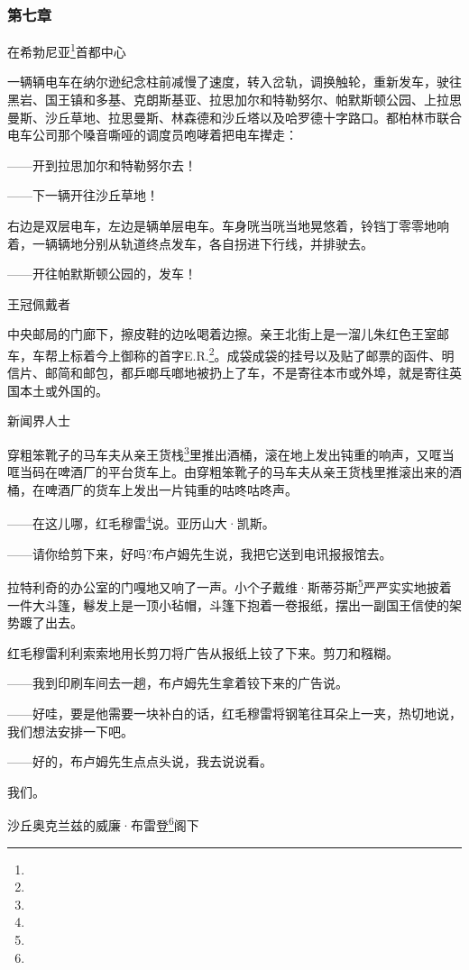 \subsubsection*{第七章}

\par 在希勃尼亚\footnote{}首都中心
\par 一辆辆电车在纳尔逊纪念柱前减慢了速度，转入岔轨，调换触轮，重新发车，驶往黑岩、国王镇和多基、克朗斯基亚、拉思加尔和特勒努尔、帕默斯顿公园、上拉思曼斯、沙丘草地、拉思曼斯、林森德和沙丘塔以及哈罗德十字路口。都柏林市联合电车公司那个嗓音嘶哑的调度员咆哮着把电车撵走：
\par ——开到拉思加尔和特勒努尔去！
\par ——下一辆开往沙丘草地！
\par 右边是双层电车，左边是辆单层电车。车身咣当咣当地晃悠着，铃铛丁零零地响着，一辆辆地分别从轨道终点发车，各自拐进下行线，并排驶去。
\par ——开往帕默斯顿公园的，发车！
\par 王冠佩戴者
\par 中央邮局的门廊下，擦皮鞋的边吆喝着边擦。亲王北街上是一溜儿朱红色王室邮车，车帮上标着今上御称的首字E.R.\footnote{}。成袋成袋的挂号以及贴了邮票的函件、明信片、邮简和邮包，都乒啷乓啷地被扔上了车，不是寄往本市或外埠，就是寄往英国本土或外国的。
\par 新闻界人士
\par 穿粗笨靴子的马车夫从亲王货栈\footnote{}里推出酒桶，滚在地上发出钝重的响声，又哐当哐当码在啤酒厂的平台货车上。由穿粗笨靴子的马车夫从亲王货栈里推滚出来的酒桶，在啤酒厂的货车上发出一片钝重的咕咚咕咚声。
\par ——在这儿哪，红毛穆雷\footnote{}说。亚历山大·凯斯。
\par ——请你给剪下来，好吗?布卢姆先生说，我把它送到电讯报报馆去。
\par 拉特利奇的办公室的门嘎地又响了一声。小个子戴维·斯蒂芬斯\footnote{}严严实实地披着一件大斗篷，鬈发上是一顶小毡帽，斗篷下抱着一卷报纸，摆出一副国王信使的架势踱了出去。
\par 红毛穆雷利利索索地用长剪刀将广告从报纸上铰了下来。剪刀和糨糊。
\par ——我到印刷车间去一趟，布卢姆先生拿着铰下来的广告说。
\par ——好哇，要是他需要一块补白的话，红毛穆雷将钢笔往耳朵上一夹，热切地说，我们想法安排一下吧。
\par ——好的，布卢姆先生点点头说，我去说说看。
\par 我们。
\par 沙丘奥克兰兹的威廉·布雷登\footnote{}阁下
